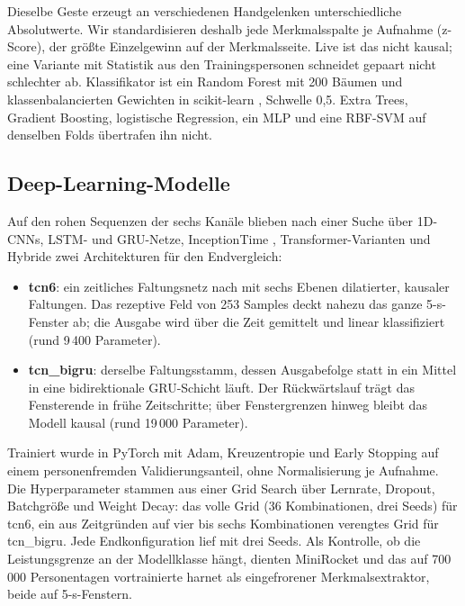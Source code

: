 Dieselbe Geste erzeugt an verschiedenen Handgelenken unterschiedliche
Absolutwerte. Wir standardisieren deshalb jede Merkmalsspalte je Aufnahme
(z-Score), der größte Einzelgewinn auf der Merkmalsseite. Live ist das nicht
kausal; eine Variante mit Statistik aus den Trainingspersonen schneidet
gepaart nicht schlechter ab.
Klassifikator ist ein Random Forest \citep{breiman2001} mit 200 Bäumen und
klassenbalancierten Gewichten in scikit-learn \citep{pedregosa2011}, Schwelle
0,5. Extra Trees, Gradient Boosting, logistische Regression, ein MLP und eine
RBF-SVM auf denselben Folds übertrafen ihn nicht.

\subsection{Deep-Learning-Modelle}
\label{sec:deep}

Auf den rohen Sequenzen der sechs Kanäle blieben nach einer Suche über
1D-CNNs, LSTM- und GRU-Netze, InceptionTime \citep{ismailfawaz2020},
Transformer-Varianten und Hybride zwei Architekturen für den Endvergleich:

\begin{itemize}
  \item \textbf{tcn6}: ein zeitliches Faltungsnetz nach \citet{bai2018} mit
  sechs Ebenen dilatierter, kausaler Faltungen. Das rezeptive Feld von 253
  Samples deckt nahezu das ganze 5-s-Fenster ab; die Ausgabe wird über die
  Zeit gemittelt und linear klassifiziert (rund 9\,400 Parameter).
  \item \textbf{tcn\_bigru}: derselbe Faltungsstamm, dessen Ausgabefolge
  statt in ein Mittel in eine bidirektionale GRU-Schicht \citep{chung2014}
  läuft. Der Rückwärtslauf trägt das Fensterende in frühe Zeitschritte; über
  Fenstergrenzen hinweg bleibt das Modell kausal (rund 19\,000 Parameter).
\end{itemize}

Trainiert wurde in PyTorch \citep{paszke2019} mit Adam, Kreuzentropie und
Early Stopping auf einem personenfremden Validierungsanteil, ohne
Normalisierung je Aufnahme. Die Hyperparameter stammen aus einer Grid Search
über Lernrate, Dropout, Batchgröße und Weight Decay: das volle Grid (36
Kombinationen, drei Seeds) für tcn6, ein aus Zeitgründen auf vier bis sechs
Kombinationen verengtes Grid für tcn\_bigru. Jede Endkonfiguration lief mit
drei Seeds. Als Kontrolle, ob die Leistungsgrenze an der Modellklasse hängt,
dienten MiniRocket \citep{dempster2021} und das auf 700\,000 Personentagen
vortrainierte harnet \citep{yuan2024} als eingefrorener Merkmalsextraktor,
beide auf 5-s-Fenstern.

